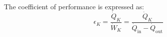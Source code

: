 The coefficient of performance is expressed as:  
\[
\epsilon_K = \frac{\dot{Q}_K}{\dot{W}_K} = \frac{\dot{Q}_K}{\dot{Q}_\text{in} - \dot{Q}_\text{out}}
\]